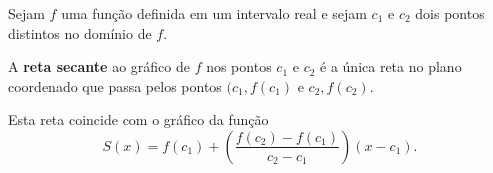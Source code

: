 \begin{definition}
	Sejam $f$ uma função definida em um intervalo real e sejam $c_1$ e $c_2$ dois pontos distintos no domínio de $f$.
	
	A \textbf{reta secante} ao gráfico de $f$ nos pontos $c_1$ e $c_2$ é a única reta no plano coordenado que passa pelos pontos $(c_1,f(c_1)$ e $c_2,f(c_2)$.

	Esta reta coincide com o gráfico da função
	\[S(x)=f(c_1)+\left(\frac{f(c_2)-f(c_1)}{c_2-c_1}\right)\left(x-c_1\right).\]
\end{definition}